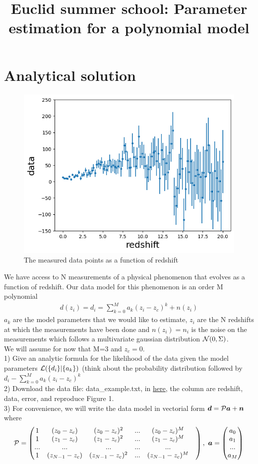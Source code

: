 \documentclass[a4paper]{article}
\title{ Euclid summer school: Parameter estimation for a polynomial model}
\def\ba{\begin{eqnarray}}
\def\ea{\end{eqnarray}}
\begin{document}
\maketitle


\section{Analytical solution}

   \begin{figure}[h!]
  \centering
  \includegraphics[width=0.5\columnwidth]{data_example.png}
  \caption{The measured data points as a function of redshift}
  \label{fig:data}
\end{figure}


We have access to N measurements of a physical phenomenon that evolves as a function of redshift. Our data model for this phenomenon is an order M polynomial 
\ba
d(z_{i}) = d_{i} =  \sum_{k=0}^{M} a_{k}(z_{i}-z_{c})^{k} + n(z_{i})
\ea
$a_{k}$ are the model parameters that we would like to estimate, $z_i$ are the N redshifts at which the measurements have been done and  $n(z_{i})=n_{i}$ is the noise on the measurements which follows a multivariate gaussian distribution ${\cal N}(0,\Sigma)$. \\
We will assume for now that M=3 and $z_{c}=0$. \\


1) Give an analytic formula for the likelihood of the data given the model parameters ${\cal L}( \{d_{i} \} | \{a_{k} \}) $ (think about the probability distribution  followed by $d_{i} - \sum_{k=0}^{M} a_{k}  (z_{i}-z_{c})^{k}$ \\


2) Download the data file: data\_example.txt, 
 in  \href{https://github.com/thibautlouis/TD/}{here}, the column are redshift, data, error, and reproduce Figure 1. \\


3) For convenience, we will write the data model in vectorial form ${\bm d} = {\cal P}\bm{a} + {\bm n}$   where 
\ba
 {\cal P}= 
 \begin{pmatrix} 
1 &
(z_{0}-z_{c}) & 
(z_{0} -z_{c})^{2}& 
... & 
(z_{0} -z_{c})^{M}
\cr
1 &
(z_{1}-z_{c}) & 
(z_{1} -z_{c})^{2}& 
... & 
(z_{1} -z_{c})^{M}
\cr
... & 
...  &
... & 
... & 
...& 
\cr
1 &
(z_{N-1}-z_{c}) & 
(z_{N-1} -z_{c})^{2}& 
... & 
(z_{N-1} -z_{c})^{M}
\cr
\end{pmatrix}, \
 {\bm a}= 
 \begin{pmatrix} 
a_{0} \cr
a_{1} \cr
... \cr
a_{M} \cr
\end{pmatrix}
\ea
\end{document}
